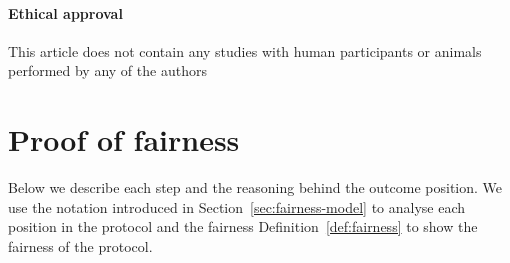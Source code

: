 \documentclass[pdftex,twocolumn,epjc3]{svjour3}
\renewcommand{\sp}{SP}
\begin{document}
\paragraph{Ethical approval} This article does not contain any studies with human participants or animals performed by any of the authors


\appendix

\begin{sloppypar}
\section{Proof of fairness}\label{app:proof-of-fairness}
Below we describe each step and the reasoning behind the outcome position.
We use the notation introduced in Section~\ref{sec:fairness-model} to analyse each position in the protocol and the fairness Definition~\ref{def:fairness} to show the fairness of the protocol.

\newcommand{\AgreeablePath}{Agreeable path:}
\newcommand{\DisputePath}{The customer starts a dispute:}
\newcommand{\Fairness}{Fairness:}
\newcommand{\CustomerTurn}[0]{\expandafter\MakeUppercase customer turn:}
\newcommand{\SPTurn}[0]{\sp{} turn:}

\newcommand{\CanFollowToOne}[2]{The #1 can follow the protocol to the non-disadvantaged position #2}
\newcommand{\CanDoNothing}[1]{The #1 can do nothing and always ends up in the non-disadvantaged position}
\newcommand{\CanDoAnything}[1]{The #1 can do anything and always ends up in the non-disadvantaged position}
\newcommand{\Pos}[4]{$\operatorname{\sigma_{#1, #2, #3} = #4}$}
\newcommand{\WinForTheSameReason}[1]{The #1 wins the dispute for the same reason}
\newcommand{\LoseForTheSameReason}[1]{The #1 loses the dispute for the same reason}
\newcommand{\ActedAbnormallyThen}[1]{The #1 acted abnormally, then:}
\newcommand{\CustomerPaidButDidntGetResult}{The customer ends up in a disadvantageous position, because he has paid in advance, but hasn't received the result}
\newcommand{\SpReceivedThePayment}{The SP ends up in the advantageous position, having received the payment}

\newcommand{\CustomerLosesBeforePayment}{The customer loses the dispute because the SP is not obliged to do anything until the transaction is paid}
\newcommand{\CustomerLosesBeforePoP}{The customer loses the dispute because the SP is still able to publish the PoP within the agreed timeframe}

\newcommand{\RemainsIn}[2]{The #1 remains in the #2 position}


\end{sloppypar}
\end{document}
